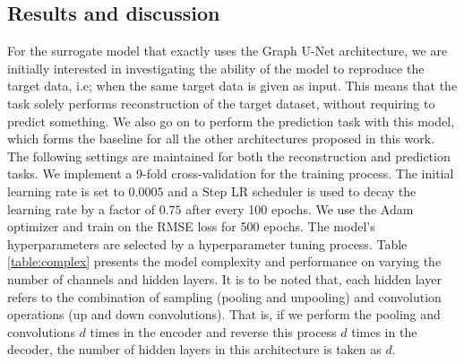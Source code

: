 \subsection{Results and discussion}
For the surrogate model that exactly uses the Graph U-Net architecture, we are initially interested in investigating the ability of the model to reproduce the target data, i.e; when the same target data is given as input. This means that the task solely performs reconstruction of the target dataset, without requiring to predict something. We also go on to perform the prediction task with this model, which forms the baseline for all the other architectures proposed in this work. The following settings are maintained for both the reconstruction and prediction tasks. We implement a 9-fold cross-validation for the training process. The initial learning rate is set to $0.0005$ and a Step LR scheduler is used to decay the learning rate by a factor of $0.75$ after every 100 epochs. We use the Adam optimizer and train on the \gls{RMSE} loss for 500 epochs. The model's hyperparameters are selected by a hyperparameter tuning process. Table \ref{table:complex} presents the model complexity and performance on varying the number of channels and hidden layers. It is to be noted that, each hidden layer refers to the combination of sampling (pooling and unpooling) and convolution operations (up and down convolutions). That is, if we perform the pooling and convolutions $d$ times in the encoder and reverse this process $d$ times in the decoder, the number of hidden layers in this architecture is taken as $d$.
